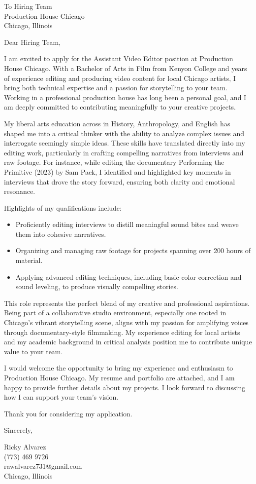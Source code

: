 \documentclass[a4paper,10pt]{letter}
\begin{document}
\begin{letter}{To Hiring Team \\ Production House Chicago \\ Chicago, Illinois}
\opening{Dear Hiring Team,}

I am excited to apply for the Assistant Video Editor position at Production House Chicago. With a Bachelor of Arts in Film from Kenyon College and years of experience editing and producing video content for local Chicago artists, I bring both technical expertise and a passion for storytelling to your team. Working in a professional production house has long been a personal goal, and I am deeply committed to contributing meaningfully to your creative projects.

My liberal arts education across in History, Anthropology, and English has shaped me into a critical thinker with the ability to analyze complex issues and interrogate seemingly simple ideas. These skills have translated directly into my editing work, particularly in crafting compelling narratives from interviews and raw footage. For instance, while editing the documentary Performing the Primitive (2023) by Sam Pack, I identified and highlighted key moments in interviews that drove the story forward, ensuring both clarity and emotional resonance.

Highlights of my qualifications include:
\begin{itemize}
    \item Proficiently editing interviews to distill meaningful sound bites and weave them into cohesive narratives.
    \item Organizing and managing raw footage for projects spanning over 200 hours of material.
    \item Applying advanced editing techniques, including basic color correction and sound leveling, to produce visually compelling stories.
\end{itemize}

This role represents the perfect blend of my creative and professional aspirations. Being part of a collaborative studio environment, especially one rooted in Chicago’s vibrant storytelling scene, aligns with my passion for amplifying voices through documentary-style filmmaking. My experience editing for local artists and my academic background in critical analysis position me to contribute unique value to your team.

I would welcome the opportunity to bring my experience and enthusiasm to Production House Chicago. My resume and portfolio are attached, and I am happy to provide further details about my projects. I look forward to discussing how I can support your team’s vision.

Thank you for considering my application.

\closing{Sincerely,}

Ricky Alvarez \\
(773) 469 9726 \\
rawalvarez731@gmail.com \\
Chicago, Illinois

\end{letter}
\end{document}
